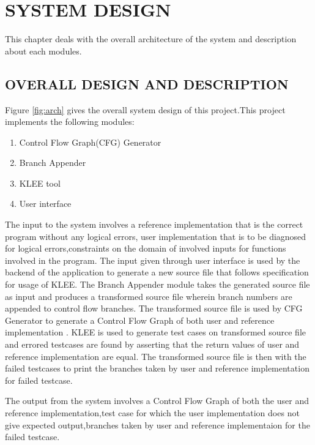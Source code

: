
\chapter{\uppercase{SYSTEM DESIGN}} %
\label{ch:chap3} %
This chapter deals with the overall architecture of the system and description about each modules.
\section{\uppercase{OVERALL DESIGN AND DESCRIPTION}}
Figure \ref{fig:arch} gives the overall system design of this project.This project implements the following modules:

\begin{enumerate}
\item Control Flow Graph(CFG) Generator
\item Branch Appender
\item KLEE tool
\item User interface
\end{enumerate}

The input to the system involves a reference implementation that is the correct program without any logical errors, user implementation that is to be diagnosed for logical errors,constraints on the domain of involved inputs for functions involved in the program. 
The input given through user interface is used by the backend of the application to generate a new source file that follows specification for usage of KLEE.
The Branch Appender module takes the generated source file as input and produces a transformed source file wherein branch numbers  are appended to control flow branches.
The transformed source file is used by CFG Generator to generate a Control Flow Graph of both user and reference implementation .
KLEE is used to generate test cases on transformed source file and errored testcases are found by asserting that the return values of user and reference implementation are equal. The transformed source file is then with the failed testcases to print the branches taken by user and reference implementation for failed testcase. 

The output from the system involves a Control Flow Graph of both the user and reference implementation,test case for which the user implementation does not give expected output,branches taken by user and reference implementaion for the failed testcase.





